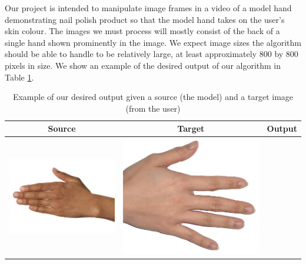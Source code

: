 Our project is intended to manipulate image frames in a video of a model hand demonstrating nail polish product so that the model hand takes on the user's skin colour. The images we must process will mostly consist of the back of a single hand shown prominently in the image. We expect image sizes the algorithm should be able to handle to be relatively large, at least approximately 800 by 800 pixels in size. We show an example of the desired output of our algorithm in Table \ref{tab:our_demo}.

\begin{table}[H]
	\centering
	\caption{Example of our desired output given a source (the model) and a target image (from the user) \label{tab:our_demo}}	
\begin{tabular}{|c|c|c|}
	\hline
	Source & Target & Output \\ 
	\hline
	  \begin{minipage}{.29\textwidth}
	    \includegraphics[width=\textwidth,height=\textheight,keepaspectratio]{../inputs/hand_brown.jpg}
	  \end{minipage} & 
	  \begin{minipage}{.29\textwidth}
	    \includegraphics[width=\textwidth,height=\textheight,keepaspectratio]{../inputs/hand_light.jpg}

\end{minipage}
\end{tabular}
\end{table}
